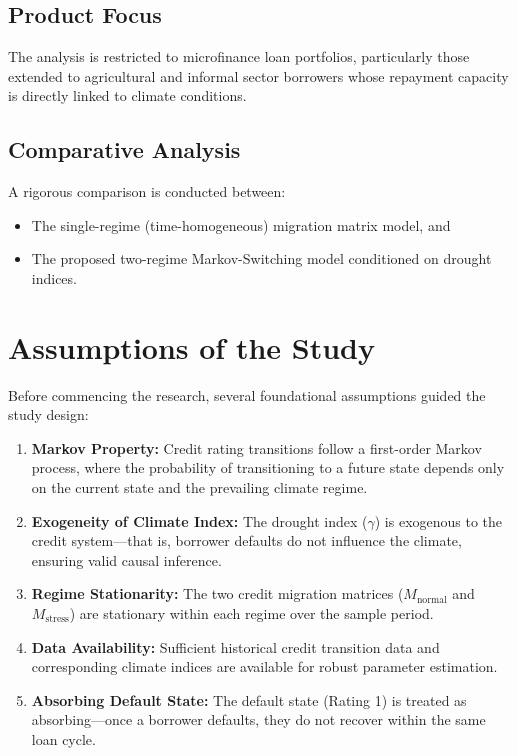 \documentclass[12pt,a4paper]{article}
\newcommand{\Mnormal}{M_{\text{normal}}}
\newcommand{\Mstress}{M_{\text{stress}}}
\begin{document}
\subsection{Product Focus}

The analysis is restricted to microfinance loan portfolios, particularly those extended to agricultural and informal sector borrowers whose repayment capacity is directly linked to climate conditions.

\subsection{Comparative Analysis}

A rigorous comparison is conducted between:
\begin{itemize}[noitemsep]
    \item The single-regime (time-homogeneous) migration matrix model, and
    \item The proposed two-regime Markov-Switching model conditioned on drought indices.
\end{itemize}

\section{Assumptions of the Study}

Before commencing the research, several foundational assumptions guided the study design:

\begin{enumerate}[noitemsep]
    \item \textbf{Markov Property:} Credit rating transitions follow a first-order Markov process, where the probability of transitioning to a future state depends only on the current state and the prevailing climate regime.
    
    \item \textbf{Exogeneity of Climate Index:} The drought index ($\gamma$) is exogenous to the credit system---that is, borrower defaults do not influence the climate, ensuring valid causal inference.
    
    \item \textbf{Regime Stationarity:} The two credit migration matrices ($\Mnormal$ and $\Mstress$) are stationary within each regime over the sample period.
    
    \item \textbf{Data Availability:} Sufficient historical credit transition data and corresponding climate indices are available for robust parameter estimation.
    
    \item \textbf{Absorbing Default State:} The default state (Rating 1) is treated as absorbing---once a borrower defaults, they do not recover within the same loan cycle.
\end{enumerate}
\end{document}

